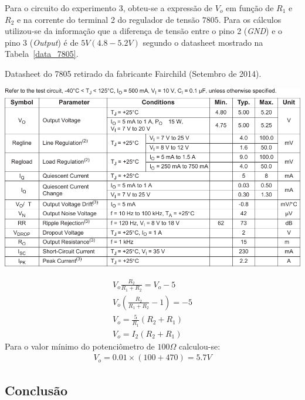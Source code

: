 \documentclass[12pt,a4paper]{article}
\begin{document}
Para o circuito do experimento 3, obteu-se a expressão de $V_o$ em função de $R_1$ e $R_2$ e na corrente do terminal 2 do regulador de tensão $7805$. Para os cálculos utilizou-se da informação que a diferença de tensão entre o pino 2 (\emph{GND}) e o pino 3 (\emph{Output}) é de $5V (4.8-5.2V)$ segundo o datasheet mostrado na Tabela~\ref{data_7805}. 
\begin{table}[htpb]
  \centering
  \caption{Datasheet do 7805 retirado da fabricante Fairchild (Setembro de 2014).}
  \label{data_7805}
  \includegraphics[width=\linewidth]{7805.pdf}
\end{table}

\begin{align}
  V_o \frac{R_2 }{R_1+R_2} = V_o -5 \\ \nonumber
  V_o \left(\frac{R_2 }{R_1+R_2} -1 \right) =-5 \\\nonumber
  V_o= \frac{5}{R_1} \left(R_2 +R_1\right)\\\nonumber
  V_o= I_2 \left(R_2 +R_1\right)\nonumber
\end{align}
Para o valor mínimo do potenciômetro de $100\Omega$ calculou-se:
\begin{align*}
  V_o = 0.01 \times \left( 100+470 \right)= 5.7 V
\end{align*}

\newpage
\subsection{Conclusão} 
\end{document}
